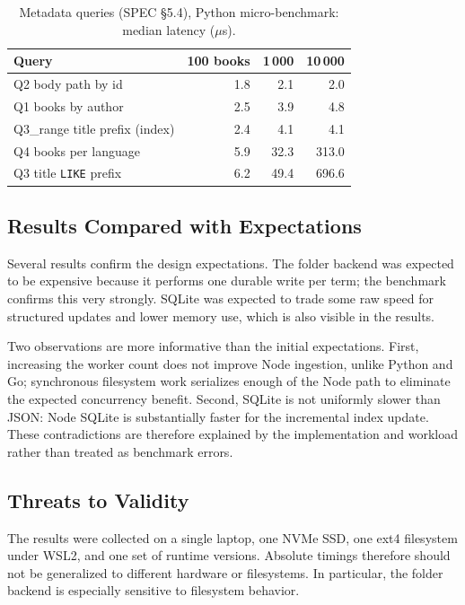 \documentclass[12pt,a4paper]{article}
\begin{document}
	\begin{table}[H]
		\centering
		\caption{Metadata queries (SPEC \S5.4), Python micro-benchmark: median latency ($\mu$s).}
		\label{tab:metaq}
		\small
		\begin{tabular}{lrrr}
			\toprule
			\textbf{Query} & \textbf{100 books} & \textbf{1\,000} & \textbf{10\,000} \\
			\midrule
			Q2 body path by id & 1.8 & 2.1 & 2.0 \\
			Q1 books by author & 2.5 & 3.9 & 4.8 \\
			Q3\_range title prefix (index) & 2.4 & 4.1 & 4.1 \\
			Q4 books per language & 5.9 & 32.3 & 313.0 \\
			Q3 title \texttt{LIKE} prefix & 6.2 & 49.4 & 696.6 \\
			\bottomrule
		\end{tabular}
	\end{table}
	
	\subsection{Results Compared with Expectations}
	
	Several results confirm the design expectations. The folder backend was expected to be
	expensive because it performs one durable write per term; the benchmark confirms this
	very strongly. SQLite was expected to trade some raw speed for structured updates and
	lower memory use, which is also visible in the results.
	
	Two observations are more informative than the initial expectations. First, increasing
	the worker count does not improve Node ingestion, unlike Python and Go; synchronous
	filesystem work serializes enough of the Node path to eliminate the expected concurrency
	benefit. Second, SQLite is not uniformly slower than JSON: Node SQLite is substantially
	faster for the incremental index update. These contradictions are therefore explained by
	the implementation and workload rather than treated as benchmark errors.
	
	\subsection{Threats to Validity}
	\label{sec:threats}
	
	The results were collected on a single laptop, one NVMe SSD, one ext4 filesystem under
	WSL2, and one set of runtime versions. Absolute timings therefore should not be generalized
	to different hardware or filesystems. In particular, the folder backend is especially
	sensitive to filesystem behavior.
	
\end{document}
